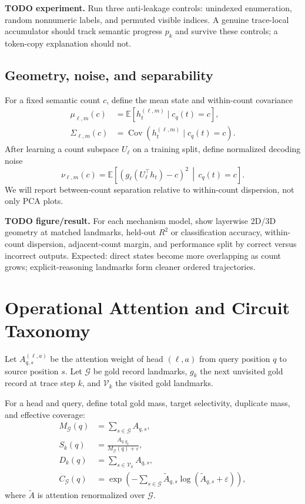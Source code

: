 \documentclass[10pt,twocolumn]{article}
\newcommand{\todoexp}[1]{%
  \par\noindent\textcolor{red!75!black}{\textbf{TODO experiment.} #1}\par}
\newcommand{\todoplot}[1]{%
  \par\noindent\textcolor{red!75!black}{\textbf{TODO figure/result.} #1}\par}
\newcommand{\eps}{\varepsilon}
\newcommand{\E}{\mathbb{E}}
\begin{document}
\todoexp{Run three anti-leakage controls: unindexed enumeration, random nonnumeric labels, and
permuted visible indices. A genuine trace-local accumulator should track semantic progress $p_k$
and survive these controls; a token-copy explanation should not.}

\subsection{Geometry, noise, and separability}
For a fixed semantic count $c$, define the mean state and within-count covariance
\[
\begin{aligned}
  \mu_{\ell,m}(c)
  &=\E[h^{(\ell,m)}_t\mid c_q(t)=c],\\
  \Sigma_{\ell,m}(c)
  &=\operatorname{Cov}\!\left(
      h^{(\ell,m)}_t\mid c_q(t)=c
    \right).
\end{aligned}
\]
After learning a count subspace $U_\ell$ on a training split, define normalized decoding noise
\[
  \nu_{\ell,m}(c)=
  \E\!\left[
  \left(g_\ell(U_\ell^\top h_t)-c\right)^2
  \,\middle|\,c_q(t)=c
  \right].
\]
We will report between-count separation relative to within-count dispersion, not only PCA plots.

\todoplot{For each mechanism model, show layerwise 2D/3D geometry at matched landmarks,
held-out $R^2$ or classification accuracy, within-count dispersion, adjacent-count margin,
and performance split by correct versus incorrect outputs. Expected: direct states become more
overlapping as count grows; explicit-reasoning landmarks form cleaner ordered trajectories.}

\section{Operational Attention and Circuit Taxonomy}
Let $A^{(\ell,a)}_{q,s}$ be the attention weight of head $(\ell,a)$ from query position $q$ to
source position $s$. Let $\mathcal{G}$ be gold record landmarks, $g_k$ the next unvisited gold
record at trace step $k$, and $\mathcal{V}_k$ the visited gold landmarks.

For a head and query, define total gold mass, target selectivity, duplicate mass, and effective
coverage:
\[
\begin{aligned}
 M_{\mathcal G}(q)&=\sum_{s\in\mathcal G}A_{q,s},\\
 S_k(q)&=\frac{A_{q,g_k}}{M_{\mathcal G}(q)+\eps},\\
 D_k(q)&=\sum_{s\in\mathcal V_k}A_{q,s},\\
 C_{\mathcal G}(q)&=\exp\!\left(
 -\sum_{s\in\mathcal G}\tilde A_{q,s}\log(\tilde A_{q,s}+\eps)
 \right),
\end{aligned}
\]
where $\tilde A$ is attention renormalized over $\mathcal G$.
\end{document}
